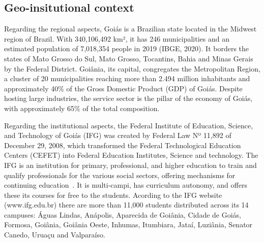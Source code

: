 \documentclass[sigconf, review]{educomp}
\begin{document}
\subsection{Geo-insitutional context}
Regarding the regional aspects, Goiás is a Brazilian state located in the Midwest region of Brazil.
With 340,106,492 km², it has 246 municipalities and an estimated population of 7,018,354 people in 2019 (IBGE, 2020).
It borders the states of Mato Grosso do Sul, Mato Grosso, Tocantins, Bahia and Minas Gerais by the Federal District.
Goiânia, its capital, congregates the Metropolitan Region, a cluster of 20 municipalities reaching more than 2.494 million inhabitants and approximately 40\% of the Gross Domestic Product (GDP) of Goiás.
Despite hosting large industries, the service sector is the pillar of the economy of Goiás, with approximately 65\% of the total composition.

Regarding the institutional aspects, the Federal Institute of Education, Science, and Technology of Goiás (IFG) was created by Federal Law Nº 11,892 of December 29, 2008, which transformed the Federal Technological Education Centers (CEFET) into Federal Education Institutes, Science and technology.
The IFG is an institution for primary, professional, and higher education to train and qualify professionals for the various social sectors, offering mechanisms for continuing education~\cite{lei2008}.
It is multi-campi, has curriculum autonomy, and offers these its courses for free to the students.
Acording to the IFG website (www.ifg.edu.br) there are more than 11,000 students distributed across its 14 campuses: Águas Lindas, Anápolis, Aparecida de Goiânia, Cidade de Goiás, Formosa, Goiânia, Goiânia Oeste, Inhumas, Itumbiara, Jataí, Luziânia, Senator Canedo, Uruaçu and Valparaíso.
\end{document}
